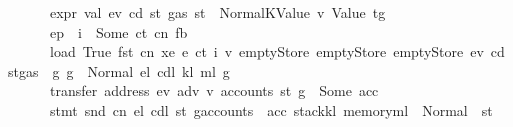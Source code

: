 \begin{isabellebody}
\ \ \ \ \ \ \ {\isachardoublequoteopen}expr\ val\ ev\ cd\ st{}\ {\isacharparenleft}{\kern0pt}gas\ st{}{\isacharparenright}{\kern0pt}\ {\isacharequal}{\kern0pt}\ Normal{\isacharparenleft}{\kern0pt}{\isacharparenleft}{\kern0pt}KValue\ v{\isacharcomma}{\kern0pt}\ Value\ t{\isacharparenright}{\kern0pt}{\isacharcomma}{\kern0pt}g{\isacharparenright}{\kern0pt}{\isachardoublequoteclose}\isanewline
\ \ \ \ \ \ \ {\isachardoublequoteopen}ep\ {\isachardollar}{\kern0pt}{\isachardollar}{\kern0pt}\ i\ {\isacharequal}{\kern0pt}\ Some\ {\isacharparenleft}{\kern0pt}ct{\isacharcomma}{\kern0pt}\ cn{\isacharcomma}{\kern0pt}\ fb{\isacharparenright}{\kern0pt}{\isachardoublequoteclose}\isanewline
\ \ \ \ \ \ \ {\isachardoublequoteopen}load\ True\ {\isacharparenleft}{\kern0pt}fst\ cn{\isacharparenright}{\kern0pt}\ xe\ {\isacharparenleft}{\kern0pt}e{\isacharprime}{\kern0pt}\ ct\ i\ v{\isacharparenright}{\kern0pt}\ emptyStore\ emptyStore\ emptyStore\ ev\ cd\ {\isacharparenleft}{\kern0pt}st{}{\isasymlparr}gas\ {\isacharcolon}{\kern0pt}{\isacharequal}{\kern0pt}\ g{\isasymrparr}{\isacharparenright}{\kern0pt}\ g\ {\isacharequal}{\kern0pt}\ Normal\ {\isacharparenleft}{\kern0pt}{\isacharparenleft}{\kern0pt}e\isactrlsub l{\isacharcomma}{\kern0pt}\ cd\isactrlsub l{\isacharcomma}{\kern0pt}\ k\isactrlsub l{\isacharcomma}{\kern0pt}\ m\isactrlsub l{\isacharparenright}{\kern0pt}{\isacharcomma}{\kern0pt}\ g{\isacharprime}{\kern0pt}{\isacharparenright}{\kern0pt}{\isachardoublequoteclose}\isanewline
\ \ \ \ \ \ \ {\isachardoublequoteopen}transfer\ {\isacharparenleft}{\kern0pt}address\ ev{\isacharparenright}{\kern0pt}\ adv{}\ v\ {\isacharparenleft}{\kern0pt}accounts\ {\isacharparenleft}{\kern0pt}st{}\ g{\isacharprime}{\kern0pt}{\isacharparenright}{\kern0pt}{\isacharparenright}{\kern0pt}\ {\isacharequal}{\kern0pt}\ Some\ acc{\isachardoublequoteclose}\isanewline
\ \ \ \ \ \ \ {\isachardoublequoteopen}stmt\ {\isacharparenleft}{\kern0pt}snd\ cn{\isacharparenright}{\kern0pt}\ e\isactrlsub l\ cd\isactrlsub l\ {\isacharparenleft}{\kern0pt}st{}\ g{\isacharprime}{\kern0pt}{\isasymlparr}accounts\ {\isacharcolon}{\kern0pt}{\isacharequal}{\kern0pt}\ acc{\isacharcomma}{\kern0pt}\ stack{\isacharcolon}{\kern0pt}{\isacharequal}{\kern0pt}k\isactrlsub l{\isacharcomma}{\kern0pt}\ memory{\isacharcolon}{\kern0pt}{\isacharequal}{\kern0pt}m\isactrlsub l{\isasymrparr}{\isacharparenright}{\kern0pt}\ {\isacharequal}{\kern0pt}\ Normal\ {\isacharparenleft}{\kern0pt}{\isacharparenleft}{\kern0pt}{\isacharparenright}{\kern0pt}{\isacharcomma}{\kern0pt}\ st{\isacharprime}{\kern0pt}{\isacharprime}{\kern0pt}{\isacharparenright}{\kern0pt}{\isachardoublequoteclose}\isanewline

\end{isabellebody}
